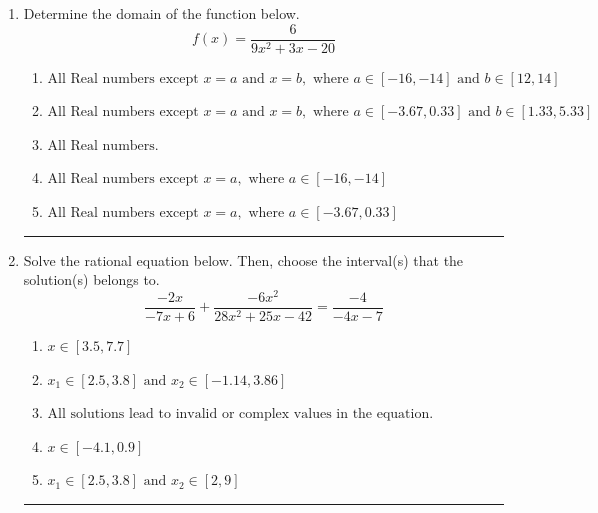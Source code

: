 \documentclass[14pt]{extbook}
\newcommand{\litem}[1]{\item#1\hspace*{-1cm}\rule{\textwidth}{0.4pt}}
\begin{document}
\begin{enumerate}
\litem{
Determine the domain of the function below.\[ f(x) = \frac{6}{9x^{2} +3 x -20} \]\begin{enumerate}[label=\Alph*.]
\item \( \text{All Real numbers except } x = a \text{ and } x = b, \text{ where } a \in [-16, -14] \text{ and } b \in [12, 14] \)
\item \( \text{All Real numbers except } x = a \text{ and } x = b, \text{ where } a \in [-3.67, 0.33] \text{ and } b \in [1.33, 5.33] \)
\item \( \text{All Real numbers.} \)
\item \( \text{All Real numbers except } x = a, \text{ where } a \in [-16, -14] \)
\item \( \text{All Real numbers except } x = a, \text{ where } a \in [-3.67, 0.33] \)

\end{enumerate} }
\litem{
Solve the rational equation below. Then, choose the interval(s) that the solution(s) belongs to.\[ \frac{-2x}{-7x + 6} + \frac{-6x^{2}}{28x^{2} +25 x -42} = \frac{-4}{-4x -7} \]\begin{enumerate}[label=\Alph*.]
\item \( x \in [3.5,7.7] \)
\item \( x_1 \in [2.5, 3.8] \text{ and } x_2 \in [-1.14,3.86] \)
\item \( \text{All solutions lead to invalid or complex values in the equation.} \)
\item \( x \in [-4.1,0.9] \)
\item \( x_1 \in [2.5, 3.8] \text{ and } x_2 \in [2,9] \)


\end{enumerate}}
\end{enumerate}
\end{document}
